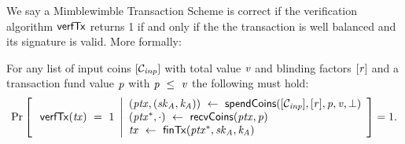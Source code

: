 We say a Mimblewimble Transaction Scheme is correct if the verification algorithm $\mathsf{verfTx}$ returns 1 if and only if the the transaction is well
balanced and its signature is valid. More formally:
\begin{definition}
    \label{def:tx-scheme-correctness}
    For any list of input coins $[\mathcal{C}_{\mathit{inp}}]$ with total value $\mathit{v}$ and blinding factors
    $[\mathit{r}]$ and a transaction fund value $\mathit{p}$ with $\mathit{p} ~\leq~ \mathit{v}$ the following must hold:
    \[
        \Pr\left[
        \begin{array}{c}
            \: \mathsf{verfTx}(\mathit{tx}) ~=~ 1
        \end{array}
        \middle\vert
        \begin{array}{l}
            (\mathit{ptx}, (\mathit{sk}_{\mathit{A}}, \mathit{\mathit{k}_{\mathit{A}}})) ~\leftarrow~ \mathsf{spendCoins}([\mathcal{C}_{\mathit{inp}}],[\mathit{r}],\mathit{p},\mathit{v},\bot) \\
            (\mathit{ptx}^*, \cdot) ~\leftarrow~ \mathsf{recvCoins}(\mathit{ptx},\mathit{p})                                                          \\
            \mathit{tx} ~\leftarrow~ \mathsf{finTx}(\mathit{ptx}^*,\mathit{sk}_{\mathit{A}},\mathit{\mathit{k}_{\mathit{A}}})
        \end{array}
        \right]=1.
    \]
\end{definition}

